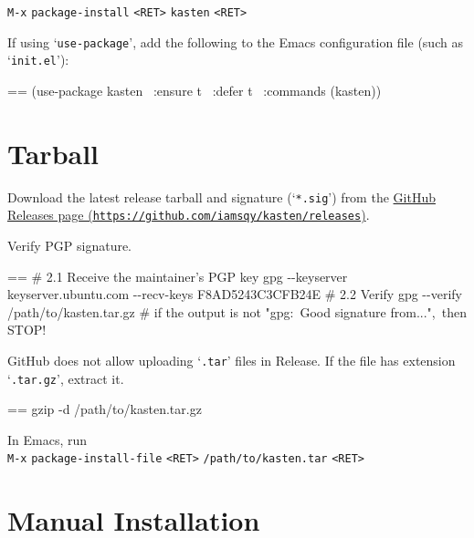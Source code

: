 \documentclass{book}
\makeatletter
\newenvironment{Texinfopreformatted}{%
  \par\GNUTobeylines\obeyspaces\frenchspacing\parskip=\z@\parindent=\z@}{}
{\catcode`\^^M=13 \gdef\GNUTobeylines{\catcode`\^^M=13 \def^^M{\null\par}}}
\newenvironment{Texinfoindented}{\begin{list}{}{}\item\relax}{\end{list}}
\renewcommand{\_}{\Texinfounderscore\discretionary{}{}{}}
\makeatother
\begin{document}
\texttt{M-x} \texttt{package-install} \texttt{<RET>} \texttt{kasten} \texttt{<RET>}

If using `\texttt{use-package}', add the following to the Emacs configuration file (such
as `\texttt{init.el}'):

\begin{Texinfoindented}
\begin{Texinfopreformatted}%
\ttfamily (use-package kasten
\  :ensure t
\  :defer t
\  :commands (kasten))
\end{Texinfopreformatted}
\end{Texinfoindented}

\section{{Tarball}}
\label{anchor:Tarball}%

\begin{enumerate}[start=1]
\item Download the latest release tarball and signature (`\texttt{*.sig}') from the \href{https://github.com/iamsqy/kasten/releases}{GitHub
Releases page (\nolinkurl{https://github.com/iamsqy/kasten/releases})}.
\item Verify PGP signature.
\begin{Texinfoindented}
\begin{Texinfopreformatted}%
\ttfamily \# 2.1 Receive the maintainer's PGP key
gpg {-}{-}keyserver keyserver.ubuntu.com {-}{-}recv-keys F8AD5243C3CFB24E
\# 2.2 Verify
gpg {-}{-}verify /path/to/kasten.tar.gz
\# if the output is not "gpg:\ Good signature from...",\ then STOP!
\end{Texinfopreformatted}
\end{Texinfoindented}
\item GitHub does not allow uploading `\texttt{.tar}' files in Release. If the
file has extension `\texttt{.tar.gz}', extract it.
\begin{Texinfoindented}
\begin{Texinfopreformatted}%
\ttfamily gzip -d /path/to/kasten.tar.gz
\end{Texinfopreformatted}
\end{Texinfoindented}
\item In Emacs, run \leavevmode{}\\
\texttt{M-x} \texttt{package-install-file} \texttt{<RET>} \texttt{/path/to/kasten.tar} \texttt{<RET>}
\end{enumerate}

\section{{Manual Installation}}
\label{anchor:Manual-Installation}%
\end{document}
